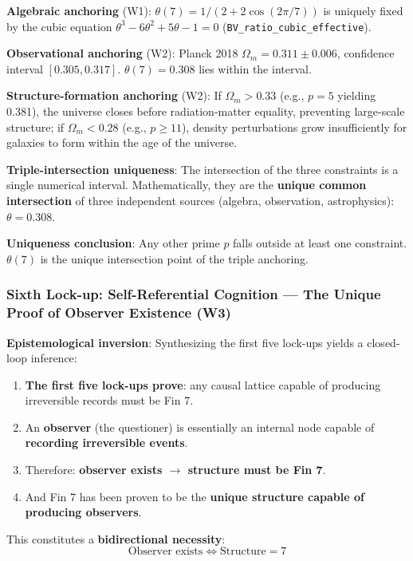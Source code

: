 \documentclass[aps,prd,twocolumn,nofootinbib,floatfix]{revtex4-2}
\begin{document}
\textbf{Algebraic anchoring} (W1): $\theta(7) = 1/(2+2\cos(2\pi/7))$ is uniquely fixed by the cubic equation $\theta^3 - 6\theta^2 + 5\theta - 1 = 0$ (\texttt{BV\_ratio\_cubic\_effective}).

\textbf{Observational anchoring} (W2): Planck 2018 $\Omega_m = 0.311 \pm 0.006$, confidence interval $[0.305, 0.317]$. $\theta(7) = 0.308$ lies within the interval.

\textbf{Structure-formation anchoring} (W2): If $\Omega_m > 0.33$ (e.g., $p=5$ yielding 0.381), the universe closes before radiation-matter equality, preventing large-scale structure; if $\Omega_m < 0.28$ (e.g., $p\geq 11$), density perturbations grow insufficiently for galaxies to form within the age of the universe.

\textbf{Triple-intersection uniqueness}: The intersection of the three constraints is a single numerical interval. Mathematically, they are the \textbf{unique common intersection} of three independent sources (algebra, observation, astrophysics): $\theta = 0.308$.

\textbf{Uniqueness conclusion}: Any other prime $p$ falls outside at least one constraint. $\theta(7)$ is the unique intersection point of the triple anchoring.

\subsubsection*{Sixth Lock-up: Self-Referential Cognition --- The Unique Proof of Observer Existence (W3)}

\textbf{Epistemological inversion}: Synthesizing the first five lock-ups yields a closed-loop inference:

\begin{enumerate}
    \item \textbf{The first five lock-ups prove}: any causal lattice capable of producing irreversible records must be Fin 7.
    \item An \textbf{observer} (the questioner) is essentially an internal node capable of \textbf{recording irreversible events}.
    \item Therefore: \textbf{observer exists $\to$ structure must be Fin 7}.
    \item And Fin 7 has been proven to be the \textbf{unique structure capable of producing observers}.
\end{enumerate}

This constitutes a \textbf{bidirectional necessity}:
$$ \boxed{\text{Observer exists} \iff \text{Structure}=7} $$
\end{document}
